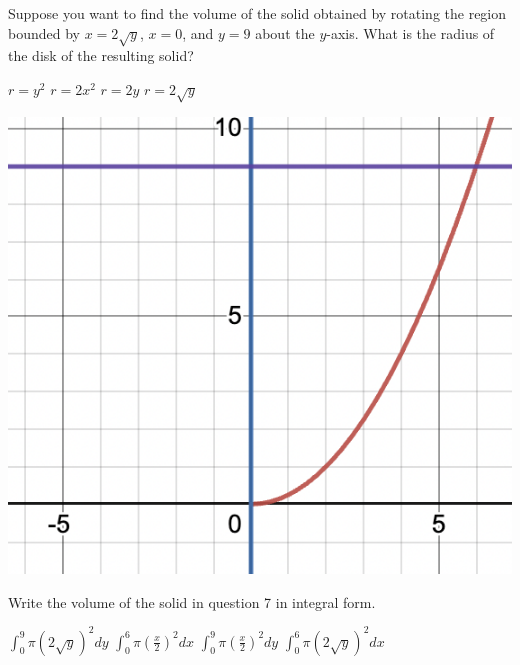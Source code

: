 \documentclass[addpoints, 12pt]{exam}%
\newcommand{\spc}{\vspace*{0.5cm}}
\begin{document}
\begin{questions}
Suppose you want to find the volume of the solid obtained by rotating the region bounded by $x = 2\sqrt{y}$, $x = 0$, and $y = 9$ about the $y$-axis. What is the radius of the disk of the resulting solid?

\begin{minipage}{0.5\textwidth}
\begin{choices}
\choice $r = y^2$ \vspace*{10pt}
\choice $r = 2x^2$ \vspace*{10pt}
\choice $r = 2y$ \vspace*{10pt}
\CorrectChoice $r = 2\sqrt{y}$ \vspace*{10pt}
\end{choices}
\end{minipage}
\hspace*{1cm}
\begin{minipage}{0.35\textwidth}
\includegraphics[width=1\textwidth]{HW15graph3.png}
\end{minipage}

\spc

\question[1]

Write the volume of the solid in question 7 in integral form.

\begin{multicols}{2}
\begin{choices}
\CorrectChoice $\int_{0}^{9} \pi (2\sqrt{y})^2dy$
\choice $\int_{0}^{6} \pi (\frac{x}{2})^2dx$
\choice $\int_{0}^{9} \pi (\frac{x}{2})^2dy$
\choice $\int_{0}^{6} \pi (2\sqrt{y})^2dx$
\end{choices}
\end{multicols}



\end{questions}
\end{document}
